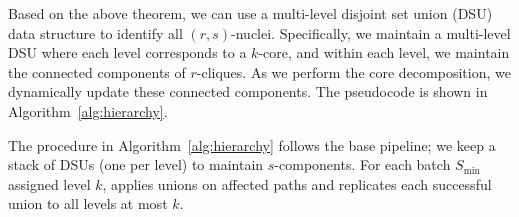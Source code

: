 
Based on the above theorem, we can use a multi-level disjoint set union (DSU) data structure to identify all $(r,s)$-nuclei. Specifically, we maintain a multi-level DSU where each level corresponds to a $k$-core, and within each level, we maintain the connected components of $r$-cliques. As we perform the core decomposition, we dynamically update these connected components. The pseudocode is shown in Algorithm~\ref{alg:hierarchy}.

\noindent
{}
% 
The procedure in Algorithm~\ref{alg:hierarchy} follows the base pipeline; we keep a stack of DSUs (one per level) to maintain $s$-components. For each batch $S_{\min}$ assigned level $k$, \UniteLevel applies unions on affected \cpi paths and replicates each successful union to all levels at most $k$.

